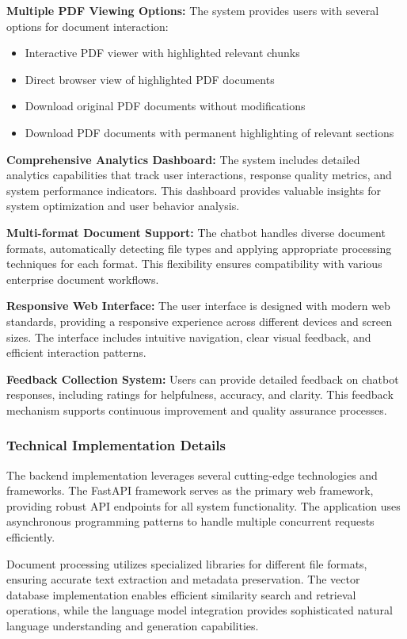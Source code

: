 \documentclass[12pt,a4paper]{article}
\begin{document}
\textbf{Multiple PDF Viewing Options:} The system provides users with several options for document interaction:
\begin{itemize}
    \item Interactive PDF viewer with highlighted relevant chunks
    \item Direct browser view of highlighted PDF documents
    \item Download original PDF documents without modifications
    \item Download PDF documents with permanent highlighting of relevant sections
\end{itemize}

\textbf{Comprehensive Analytics Dashboard:} The system includes detailed analytics capabilities that track user interactions, response quality metrics, and system performance indicators. This dashboard provides valuable insights for system optimization and user behavior analysis.

\textbf{Multi-format Document Support:} The chatbot handles diverse document formats, automatically detecting file types and applying appropriate processing techniques for each format. This flexibility ensures compatibility with various enterprise document workflows.

\textbf{Responsive Web Interface:} The user interface is designed with modern web standards, providing a responsive experience across different devices and screen sizes. The interface includes intuitive navigation, clear visual feedback, and efficient interaction patterns.

\textbf{Feedback Collection System:} Users can provide detailed feedback on chatbot responses, including ratings for helpfulness, accuracy, and clarity. This feedback mechanism supports continuous improvement and quality assurance processes.

\subsubsection{Technical Implementation Details}

The backend implementation leverages several cutting-edge technologies and frameworks. The FastAPI framework serves as the primary web framework, providing robust API endpoints for all system functionality. The application uses asynchronous programming patterns to handle multiple concurrent requests efficiently.

Document processing utilizes specialized libraries for different file formats, ensuring accurate text extraction and metadata preservation. The vector database implementation enables efficient similarity search and retrieval operations, while the language model integration provides sophisticated natural language understanding and generation capabilities.
\end{document}
